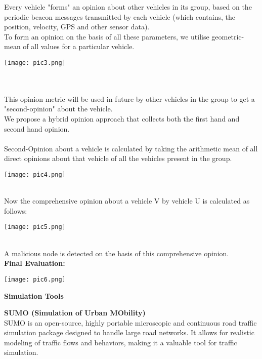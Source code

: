 \documentclass[a4paper,14pt]{extarticle}
\begin{document}
Every vehicle "forms" an opinion about other vehicles in its group, based on the periodic beacon messages transmitted by each vehicle (which contains, the position, velocity, GPS and other sensor data).
\\ 
To form an opinion on the basis of all these parameters, we utilise geometric-mean of all values for a particular vehicle.
\\
\begin{center}
    \texttt{[image: pic3.png]}
\end{center}
\\ \\
This opinion metric will be used in future by other vehicles in the group to get a "second-opinion" about the vehicle. 
\\
We propose a hybrid opinion approach that collects both the first hand and second hand opinion.
\\ \\ 
Second-Opinion about a vehicle is calculated by taking the arithmetic mean of all direct opinions about that vehicle of all the vehicles present in the group.
\\
\begin{center}
    \texttt{[image: pic4.png]}
\end{center}
\\
Now the comprehensive opinion about a vehicle V by vehicle U is calculated as follows:
\\
\begin{center}
    \texttt{[image: pic5.png]}
\end{center}
\\ 
A malicious node is detected on the basis of this comprehensive opinion. 
\\
\newpage
\textbf{Final Evaluation:}
\begin{center}
    \texttt{[image: pic6.png]}
\end{center}
\newpage
\begin{center}
    {\LARGE \textbf{Simulation Tools}} \\
    \vspace{1cm}
\end{center}
\textbf{SUMO (Simulation of Urban MObility) }\\
SUMO is an open-source, highly portable microscopic and continuous road traffic simulation package designed to handle large road networks. It allows for realistic modeling of traffic flows and behaviors, making it a valuable tool for traffic simulation. 
\end{document}
